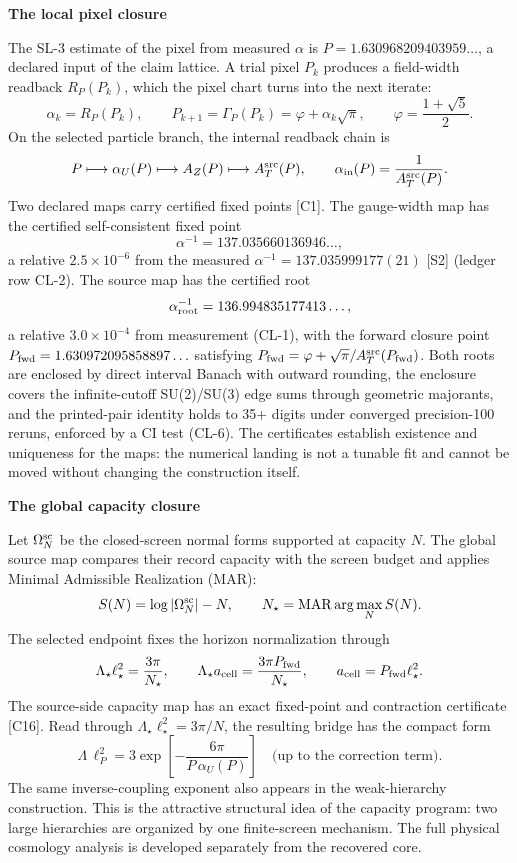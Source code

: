 \documentclass[10pt]{article}
\newcommand{\sect}[1]{\vspace{0.36em}{\large\bfseries\color{pragmaCyanText}#1}\par\vspace{-0.04em}}
\begin{document}
\sect{3. From closure coordinates to physical structure}
\vspace{0.08em}
{\bfseries\color{pragmaCyanText}The local pixel closure}\par

The SL-3 estimate of the pixel from measured \(\alpha\) is
\(P=1.630968209403959\ldots\), a declared input of the claim lattice. A trial
pixel \(P_k\) produces a field-width readback \(R_P(P_k)\), which the pixel
chart turns into the next iterate:
\[
  \alpha_k=R_P(P_k),
  \qquad
  P_{k+1}=\Gamma_P(P_k)=\varphi+\alpha_k\sqrt\pi,
  \qquad
  \varphi=\frac{1+\sqrt5}{2}.
\]
On the selected particle branch, the internal readback chain is
\[
  P\longmapsto\alpha_U(P)\longmapsto A_Z(P)
  \longmapsto A_T^{\rm src}(P),
  \qquad
  \alpha_{\rm in}(P)=\frac{1}{A_T^{\rm src}(P)}.
\]
Two declared maps carry certified fixed points [C1]. The gauge-width map has
the certified self-consistent fixed point
\[
  \alpha^{-1}=137.035660136946\ldots,
\]
a relative \(2.5\times10^{-6}\) from the measured
\(\alpha^{-1}=137.035999177(21)\) [S2] (ledger row CL-2). The source map has
the certified root
\[
  \alpha_{\rm root}^{-1}=136.994835177413\ldots,
\]
a relative \(3.0\times10^{-4}\) from measurement (CL-1), with the forward
closure point \(P_{\rm fwd}=1.630972095858897\ldots\) satisfying
\(P_{\rm fwd}=\varphi+\sqrt\pi/A_T^{\rm src}(P_{\rm fwd})\). Both roots are
enclosed by direct interval Banach with outward rounding, the enclosure
covers the infinite-cutoff SU(2)/SU(3) edge sums through geometric majorants,
and the printed-pair identity holds to 35+ digits under converged
precision-100 reruns, enforced by a CI test (CL-6). The certificates
establish existence and uniqueness for the maps: the numerical landing is not
a tunable fit and cannot be moved without changing the construction itself.

\vspace{0.14em}
{\bfseries\color{pragmaCyanText}The global capacity closure}\par

Let \(\Omega_N^{\rm sc}\) be the closed-screen normal forms supported at
capacity \(N\). The global source map compares their record capacity with the
screen budget and applies Minimal Admissible Realization (MAR):
\[
  S(N)=\log|\Omega_N^{\rm sc}|-N,
  \qquad
  N_\star=\operatorname{MAR}\arg\max_N S(N).
\]
The selected endpoint fixes the horizon normalization through
\[
  \Lambda_\star\ell_\star^2=\frac{3\pi}{N_\star},
  \qquad
  \Lambda_\star a_{\rm cell}=\frac{3\pi P_{\rm fwd}}{N_\star},
  \qquad
  a_{\rm cell}=P_{\rm fwd}\ell_\star^2.
\]
The source-side capacity map has an exact fixed-point and contraction
certificate [C16]. Read through
\(\Lambda_\star\ell_\star^2=3\pi/N\), the resulting bridge has the compact
form
\[
\Lambda\,\ell_P^2
=3\exp\!\left[-\frac{6\pi}{P\,\alpha_U(P)}\right]
\quad\text{(up to the correction term)}.
\]
The same inverse-coupling exponent also appears in the weak-hierarchy
construction. This is the attractive structural idea of the capacity program:
two large hierarchies are organized by one finite-screen mechanism. The full
physical cosmology analysis is developed separately from the recovered core.
\end{document}
